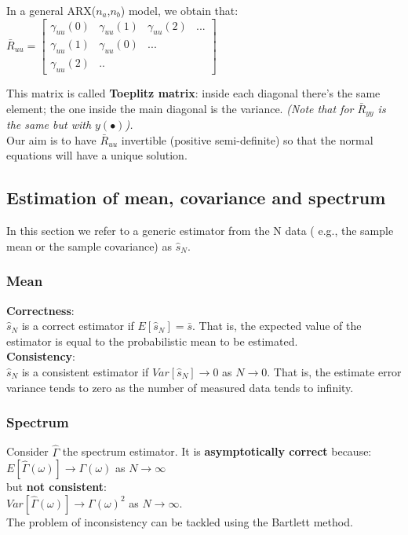 \documentclass[10pt,a4paper]{article}
\begin{document}
In a general ARX($n_a$,$n_b$) model, we obtain that:
\center
 $\bar{R}_{uu}= \begin{bmatrix}
\gamma_{uu}(0) & \gamma_{uu}(1) & \gamma_{uu}(2) & ...\\
\gamma_{uu}(1) & \gamma_{uu}(0) & ... \\
\gamma_{uu}(2) & ..
\end{bmatrix}$
\\ \raggedright \vspace{0.5em}
This matrix is called \textbf{Toeplitz matrix}: inside each diagonal there's the same element; the one inside the main diagonal is the variance. \textit{(Note that for $\bar{R}_{yy}$ is the same but with $y(\bullet)$).} \\
Our aim is to have $\bar{R}_{uu}$ invertible (positive semi-definite) so that the normal equations will have a unique solution.
\subsection{Estimation of mean, covariance and spectrum}
In this section we refer to a generic estimator from the N data ( e.g., the sample mean or the sample covariance) as $\hat{s}_N$. \\
\subsubsection{Mean}
\textbf{Correctness}: \\
$\hat{s}_N$ is a correct estimator if $E[\hat{s}_N]=\bar{s}$. That is, the expected value of the estimator is equal to the probabilistic mean to be estimated. \\
\textbf{Consistency}: \\
$\hat{s}_N$ is a consistent estimator if $Var[\hat{s}_N] \rightarrow 0$ as $N \rightarrow 0$. That is, the estimate error variance tends to zero as the number of measured data tends to infinity.
\subsubsection{Spectrum}
Consider $\hat{\Gamma}$ the spectrum estimator. It is \textbf{asymptotically correct} because: \\ $E[\hat{\Gamma}(\omega)] \rightarrow \Gamma(\omega)$ as $N \rightarrow \infty$ \\ but \textbf{not consistent}: \\ $Var[\hat{\Gamma}(\omega)] \rightarrow \Gamma(\omega)^2$ as $N \rightarrow \infty$. \\ The problem of inconsistency can be tackled using the Bartlett method.
\end{document}
